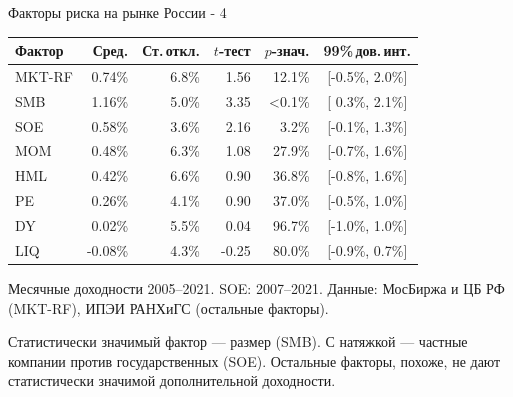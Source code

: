 \documentclass{beamer}
\begin{document}
\begin{frame}{Факторы риска на рынке России - 4}
\centering
\begin{tabular}{l|r|r|r|r|c}
Фактор & Сред. & Ст.\,откл. & $t$-тест & $p$-знач. & 99\%\,дов.\,инт. \\
\hline
MKT-RF &  0.74\% & 6.8\% &  1.56 & 12.1\% & [-0.5\%, 2.0\%] \\
SMB    &  1.16\% & 5.0\% &  3.35 & <0.1\% & [ 0.3\%, 2.1\%] \\        
SOE    &  0.58\% & 3.6\% &  2.16 &  3.2\% & [-0.1\%, 1.3\%] \\        
MOM    &  0.48\% & 6.3\% &  1.08 & 27.9\% & [-0.7\%, 1.6\%] \\       
HML    &  0.42\% & 6.6\% &  0.90 & 36.8\% & [-0.8\%, 1.6\%] \\    
PE     &  0.26\% & 4.1\% &  0.90 & 37.0\% & [-0.5\%, 1.0\%] \\        
DY     &  0.02\% & 5.5\% &  0.04 & 96.7\% & [-1.0\%, 1.0\%] \\        
LIQ    & -0.08\% & 4.3\% & -0.25 & 80.0\% & [-0.9\%, 0.7\%] \\     
\hline
\end{tabular}

\justify
{\scriptsize Месячные доходности 2005--2021. SOE: 2007--2021. Данные: МосБиржа 
и ЦБ РФ (MKT-RF), ИПЭИ РАНХиГС (остальные факторы).}

\justify
Статистически значимый фактор --- размер (SMB). С натяжкой ---  частные 
компании против государственных (SOE). Остальные факторы, похоже, не дают 
статистически значимой дополнительной доходности.
\end{frame}
\end{document}
